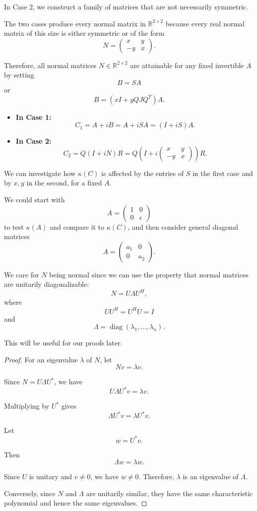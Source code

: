 \documentclass[11pt, reqno, a4paper]{amsart}
\theoremstyle{plain}
\theoremstyle{definition}
\theoremstyle{remark}
\numberwithin{equation}{section}
\begin{document}
In Case 2, we construct a family of matrices that are not necessarily symmetric.

The two cases produce every normal matrix in $\mathbb{R}^{2\times2}$ because every real normal matrix of this size is either symmetric or of the form
\[
N=
\begin{pmatrix}
x&y\\
-y&x
\end{pmatrix}.
\]

Therefore, all normal matrices $N\in\mathbb{R}^{2\times2}$ are attainable for any fixed invertible $A$ by setting
\[
B=SA
\]
or
\[
B=(xI+yQJQ^T)A.
\]

\begin{itemize}
    \item \textbf{In Case 1:}
    \[
    C_1=A+iB=A+iSA=(I+iS)A.
    \]

    \item \textbf{In Case 2:}
    \[
    C_2=Q(I+iN)R
    =
    Q\left(
    I+i
    \begin{pmatrix}
    x&y\\
    -y&x
    \end{pmatrix}
    \right)R.
    \]
\end{itemize}

We can investigate how $\kappa(C)$ is affected by the entries of $S$ in the first case and by $x,y$ in the second, for a fixed $A$.

We could start with
\[
A=
\begin{pmatrix}
1&0\\
0&\epsilon
\end{pmatrix}
\]
to test $\kappa(A)$ and compare it to $\kappa(C)$, and then consider general diagonal matrices
\[
A=
\begin{pmatrix}
a_1&0\\
0&a_2
\end{pmatrix}.
\]

We care for $N$ being normal since we can use the property that normal matrices are unitarily diagonalizable:
\[
N=U\Lambda U^H,
\]
where
\[
UU^H=U^HU=I
\]
and
\[
\Lambda=\operatorname{diag}(\lambda_1,\ldots,\lambda_n).
\]

This will be useful for our proofs later.

\begin{proof}
For an eigenvalue $\lambda$ of $N$, let
\[
Nv=\lambda v.
\]

Since $N=U\Lambda U^*$, we have
\[
U\Lambda U^*v=\lambda v.
\]

Multiplying by $U^*$ gives
\[
\Lambda U^*v=\lambda U^*v.
\]

Let
\[
w=U^*v.
\]

Then
\[
\Lambda w=\lambda w.
\]

Since $U$ is unitary and $v\neq0$, we have $w\neq0$. Therefore, $\lambda$ is an eigenvalue of $\Lambda$.

Conversely, since $N$ and $\Lambda$ are unitarily similar, they have the same characteristic polynomial and hence the same eigenvalues.
\end{proof}
\end{document}
